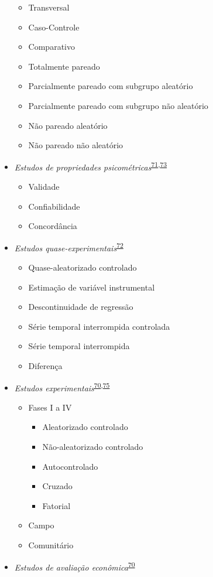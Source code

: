 \documentclass[
]{book}
\begin{document}
\begin{itemize}
  \begin{itemize}
  \item
    Transversal
  \item
    Caso-Controle
  \item
    Comparativo
  \item
    Totalmente pareado
  \item
    Parcialmente pareado com subgrupo aleatório
  \item
    Parcialmente pareado com subgrupo não aleatório
  \item
    Não pareado aleatório
  \item
    Não pareado não aleatório
  \end{itemize}
\item
  \emph{Estudos de propriedades psicométricas}\textsuperscript{\protect\hyperlink{ref-Souza2017}{71},\protect\hyperlink{ref-echevarruxeda-guanilo2019}{73}}

  \begin{itemize}
  \item
    Validade
  \item
    Confiabilidade
  \item
    Concordância
  \end{itemize}
\item
  \emph{Estudos quase-experimentais}\textsuperscript{\protect\hyperlink{ref-reeves2017}{72}}

  \begin{itemize}
  \item
    Quase-aleatorizado controlado
  \item
    Estimação de variável instrumental
  \item
    Descontinuidade de regressão
  \item
    Série temporal interrompida controlada
  \item
    Série temporal interrompida
  \item
    Diferença
  \end{itemize}
\item
  \emph{Estudos experimentais}\textsuperscript{\protect\hyperlink{ref-Suxfct2014}{70},\protect\hyperlink{ref-Chidambaram2019}{75}}

  \begin{itemize}
  \item
    Fases I a IV

    \begin{itemize}
    \item
      Aleatorizado controlado
    \item
      Não-aleatorizado controlado
    \item
      Autocontrolado
    \item
      Cruzado
    \item
      Fatorial
    \end{itemize}
  \item
    Campo
  \item
    Comunitário
  \end{itemize}
\item
  \emph{Estudos de avaliação econômica}\textsuperscript{\protect\hyperlink{ref-Suxfct2014}{70}}


\end{itemize}
\end{document}
